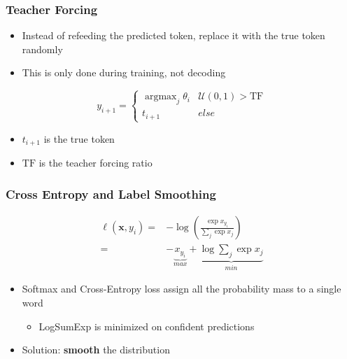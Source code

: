 \documentclass[usenames,dvipsnames]{beamer}
\DeclareMathOperator*{\argmax}{argmax}
\begin{document}
\begin{frame}
\frametitle{Teacher Forcing}
\begin{itemize}
  \item Instead of refeeding the predicted token, replace it with the true token randomly
  \item This is only done during training, not decoding
\end{itemize}
\begin{equation*}
  y_{i+1} = \begin{cases}
    \argmax_{j} \theta_i  & \mathcal{U}(0, 1) > \text{TF} \\
    t_{i+1} & else
  \end{cases}
\end{equation*}
\begin{itemize}
  \item $t_{i+1}$ is the true token
  \item $\text{TF}$ is the teacher forcing ratio
\end{itemize}
\end{frame}


\begin{frame}
\frametitle{Cross Entropy and Label Smoothing}
\begin{equation*}
  \begin{split}
    \ell\left(\mathbf{x}, y_i\right) =& - \log \left( \frac{\exp x_{y_i} }{\sum_j \exp x_j} \right) \\
    =& -\underbrace{x_{y_i}}_{max} + \underbrace{\log \sum_j \exp x_j}_{min}
  \end{split}
\end{equation*}
\begin{itemize}
  \item Softmax and Cross-Entropy loss assign all the probability mass to a single word
  \begin{itemize}
    \item LogSumExp is minimized on confident predictions
  \end{itemize}
  \item Solution: \textbf{smooth} the distribution
\end{itemize}
\end{frame}
\end{document}
